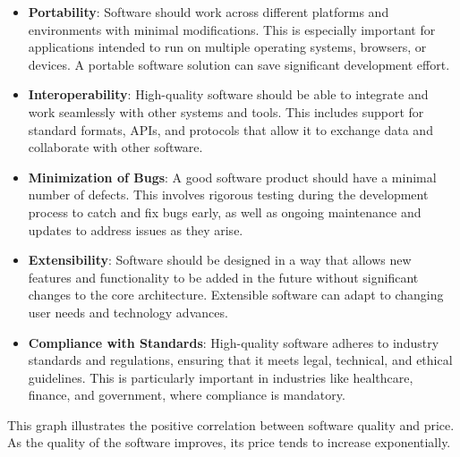 \begin{itemize}
\item \textbf{Portability}:  
Software should work across different platforms and environments with minimal modifications. This is especially important for applications intended to run on multiple operating systems, browsers, or devices. A portable software solution can save significant development effort.

\item \textbf{Interoperability}:  
High-quality software should be able to integrate and work seamlessly with other systems and tools. This includes support for standard formats, APIs, and protocols that allow it to exchange data and collaborate with other software.

\item \textbf{Minimization of Bugs}:  
A good software product should have a minimal number of defects. This involves rigorous testing during the development process to catch and fix bugs early, as well as ongoing maintenance and updates to address issues as they arise.

\item \textbf{Extensibility}:  
Software should be designed in a way that allows new features and functionality to be added in the future without significant changes to the core architecture. Extensible software can adapt to changing user needs and technology advances.

\item \textbf{Compliance with Standards}:  
High-quality software adheres to industry standards and regulations, ensuring that it meets legal, technical, and ethical guidelines. This is particularly important in industries like healthcare, finance, and government, where compliance is mandatory.
\end{itemize}

\vspace{0.5cm}
\begin{center}
\end{center}
This graph illustrates the positive correlation between software quality and price. As the quality of the software improves, its price tends to increase exponentially.
